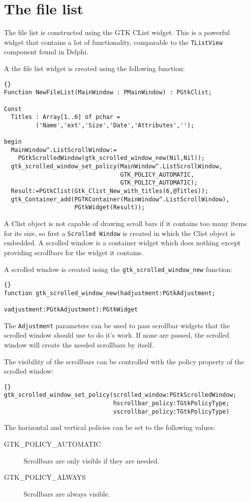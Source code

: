 \documentclass[10pt]{article}
\begin{document}
\section{The file list}
The file list is constructed using the GTK CList widget. This is a powerful
widget that contains a lot of functionality, comparable to the
\lstinline|TListView| component found in Delphi.

A the file list  widget is created using the following function:
\begin{lstlisting}{}
Function NewFileList(MainWindow : PMainWindow) : PGtkClist;

Const 
  Titles : Array[1..6] of pchar = 
         ('Name','ext','Size','Date','Attributes','');

begin
  MainWindow^.ListScrollWindow:=
    PGtkScrolledWindow(gtk_scrolled_window_new(Nil,Nil));
  gtk_scrolled_window_set_policy(MainWindow^.ListScrollWindow,
                                 GTK_POLICY_AUTOMATIC,
                                 GTK_POLICY_AUTOMATIC);
  Result:=PGtkClist(Gtk_Clist_New_with_titles(6,@Titles));
  gtk_Container_add(PGTKContainer(MainWindow^.ListScrollWindow),
                    PGtkWidget(Result));
\end{lstlisting}
A Clist object is not capable of drawing scroll bars if it contains too many
items for its size, so first a \lstinline|Scrolled Window| is created in which
the Clist object is embedded. A scrolled window is a container widget which 
does nothing except providing scrollbars for the widget it contains.

A scrolled window is created using the \lstinline|gtk_scrolled_window_new|
function:
\begin{lstlisting}{}
function gtk_scrolled_window_new(hadjustment:PGtkAdjustment;
                                 vadjustment:PGtkAdjustment):PGtkWidget
\end{lstlisting}
The \lstinline|Adjustment| parameters can be used to pass scrollbar widgets
that the scrolled window should use to do it's work.
If none are passed, the scrolled window will create the needed scrollbars
by itself.

The visibility of the scrollbars can be controlled with the policy property
of the scrolled window:
\begin{lstlisting}{}
gtk_scrolled_window_set_policy(scrolled_window:PGtkScrolledWindow;
                               hscrollbar_policy:TGtkPolicyType; 
                               vscrollbar_policy:TGtkPolicyType)
\end{lstlisting}
The horizontal and vertical policies can be set to the following values:
\begin{description}
\item[GTK\_POLICY\_AUTOMATIC] Scrollbars are only visible if they are needed.
\item[GTK\_POLICY\_ALWAYS] Scrollbars are always visible.
\end{description}
\end{document}
